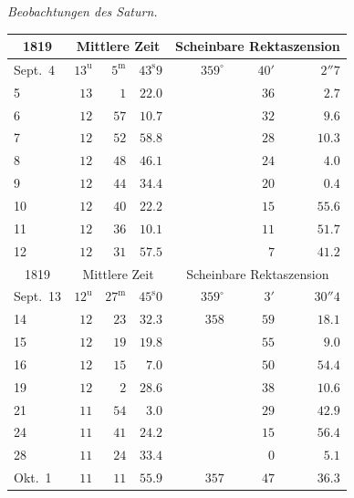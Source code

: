 \begin{center}
\emph{Beobachtungen des Saturn.}

\small
\setlength{\tabcolsep}{5pt}
\begin{tabular}{l|rrr|rrr}
\multicolumn{1}{c|}{1819}  &  \multicolumn{3}{c|}{Mittlere Zeit}  &  \multicolumn{3}{c}{Scheinbare Rektaszension}  \\
\hline
Sept.\ 4  &  $13^{\mathrm u}$  &  $5^{\mathrm m}$  &  $43^{\mathrm s}9$  &  $359^\circ$  &  $40'$  &  $2''7$  \\
5  &  $13$  &  $1$  &  $22.0$  &   &  $36$  &  $2.7$  \\
6  &  $12$  &  $57$  &  $10.7$  &   &  $32$  &  $9.6$  \\
7  &  $12$  &  $52$  &  $58.8$  &   &  $28$  &  $10.3$  \\
8  &  $12$  &  $48$  &  $46.1$  &   &  $24$  &  $4.0$  \\
9  &  $12$  &  $44$  &  $34.4$  &   &  $20$  &  $0.4$  \\
10  &  $12$  &  $40$  &  $22.2$  &   &  $15$  &  $55.6$  \\
11  &  $12$  &  $36$  &  $10.1$  &   &  $11$  &  $51.7$  \\
12  &  $12$  &  $31$  &  $57.5$  &   &  $7$  &  $41.2$  \\
\hline
 \multicolumn{1}{c|}{1819}  &  \multicolumn{3}{c|}{Mittlere Zeit}  &  \multicolumn{3}{c}{Scheinbare Rektaszension}  \\
\hline
 Sept.\ 13  &  $12^{\mathrm u}$  &  $27^{\mathrm m}$  &  $45^{\mathrm s}0$  &  $359^\circ$  &  $3'$  &  $30''4$  \\
 14  &  $12$  &  $23$  &  $32.3$  &  $358$  &  $59$  &  $18.1$  \\
 15  &  $12$  &  $19$  &  $19.8$  &   &  $55$  &  $9.0$  \\
 16  &  $12$  &  $15$  &  $7.0$  &   &  $50$  &  $54.4$  \\
 19  &  $12$  &  $2$  &  $28.6$  &   &  $38$  &  $10.6$  \\
 21  &  $11$  &  $54$  &  $3.0$  &   &  $29$  &  $42.9$  \\
 24  &  $11$  &  $41$  &  $24.2$  &   &  $15$  &  $56.4$  \\
 28  &  $11$  &  $24$  &  $33.4$  &   &  $0$  &  $5.1$  \\
 Okt.\ 1  &  $11$  &  $11$  &  $55.9$  &  $357$  &  $47$  &  $36.3$  \\
\end{tabular}
\end{center}

